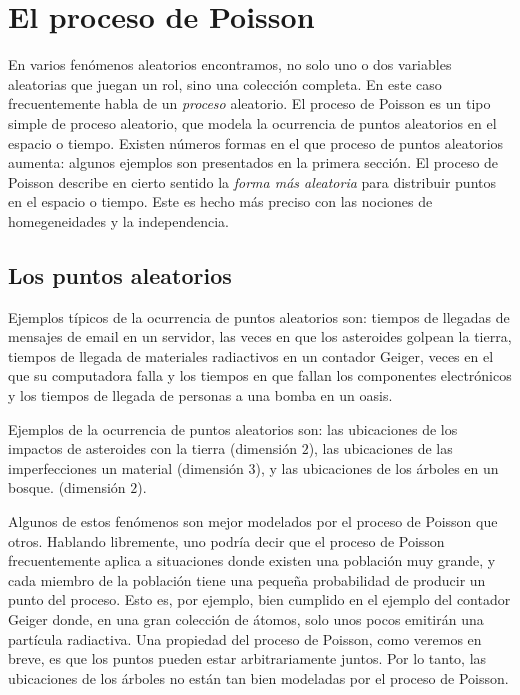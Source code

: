 \documentclass[12pt,a4paper]{kommaexam}
\begin{document}
\chapter{El proceso de Poisson}
\label{chap:1}

En varios fenómenos aleatorios encontramos, no solo uno o dos variables aleatorias que juegan un rol, sino una colección completa. En este caso frecuentemente habla de un \textit{proceso} aleatorio. El proceso de Poisson es un tipo simple de proceso aleatorio, que modela la ocurrencia de puntos aleatorios en el espacio o tiempo. Existen números formas en el que proceso de puntos aleatorios aumenta: algunos ejemplos son presentados en la primera sección. El proceso de Poisson describe en cierto sentido la \textit{forma más aleatoria} para distribuir puntos en el espacio o tiempo. Este es hecho más preciso con las nociones de homegeneidades y la independencia.

\section{Los puntos aleatorios}

Ejemplos típicos de la ocurrencia de puntos aleatorios son: tiempos de llegadas de mensajes de email en un servidor, las veces en que los asteroides golpean la tierra, tiempos de llegada de materiales radiactivos en un contador Geiger, veces en el que su computadora falla y los tiempos en que fallan los componentes electrónicos y los tiempos de llegada de personas a una bomba en un oasis.

Ejemplos de la ocurrencia de puntos aleatorios son: las ubicaciones de los impactos de asteroides con la tierra (dimensión $2$), las ubicaciones de las imperfecciones un material (dimensión $3$), y las ubicaciones de los árboles en un bosque. (dimensión $2$).

Algunos de estos fenómenos son mejor modelados por el proceso de Poisson que otros. Hablando libremente, uno podría decir que el proceso de Poisson frecuentemente aplica a situaciones donde existen una población muy grande, y cada miembro de la población tiene una pequeña probabilidad de producir un punto del proceso. Esto es, por ejemplo, bien cumplido en el ejemplo del contador Geiger donde, en una gran colección de átomos, solo unos pocos emitirán una partícula radiactiva. Una propiedad del proceso de Poisson, como veremos en breve, es que los puntos pueden estar arbitrariamente juntos. Por lo tanto, las ubicaciones de los árboles no están tan bien modeladas por el proceso de Poisson.
\end{document}
